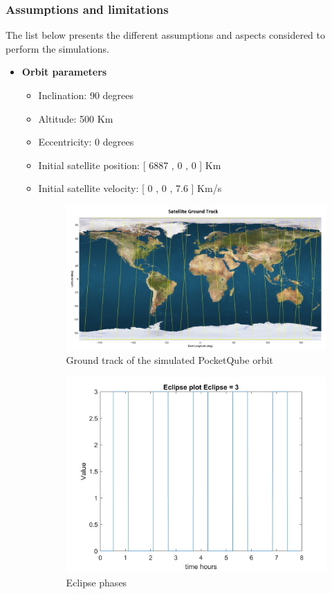\subsubsection{Assumptions and limitations}
The list below presents the different assumptions and aspects considered to perform the simulations.
\begin{itemize}
    \item \textbf{Orbit parameters}
    \begin{itemize}
        \item Inclination: 90 degrees
        \item Altitude: 500 Km
        \item Eccentricity: 0 degrees
        \item Initial satellite position: [ 6887 , 0 , 0 ] Km
        \item Initial satellite velocity: [ 0 , 0 , 7.6 ] Km/s
        \begin{figure}[H]
            \centering
            \includegraphics[width=0.8\linewidth]{res/img/3_simulation_performance/Sat_groundtrack.png}
            \caption{Ground track of the simulated PocketQube orbit}
            \label{fig:GTrack}
        \end{figure}

        \begin{figure}[H]
            \centering
            \includegraphics[width=0.7\linewidth]{res/img/Nadir_no_EKF/Eclipse phases.png}
            \caption{Eclipse phases}
            \label{fig:EclipsePhases}
        \end{figure}


\end{itemize}
\end{itemize}
